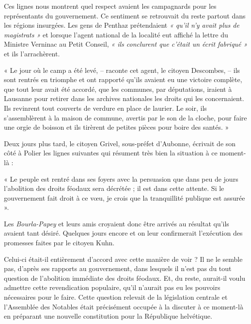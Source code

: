 \documentclass[french,twoside]{book} %
\newenvironment{quoteblock}%
  {\begin{quoting}}
  {\end{quoting}}
\newenvironment{quotebar}{%
    \def\FrameCommand{{\color{rubric!10!}\vrule width 0.5em} \hspace{0.9em}}%
    \def\OuterFrameSep{\itemsep} %
    \MakeFramed {\advance\hsize-\width \FrameRestore}
  }%
  {%
    \endMakeFramed
  }
\renewenvironment{quoteblock}%
  {%
    \savenotes
    \setstretch{0.9}
    \begin{quotebar}
  }
  {%
    \end{quotebar}
    \spewnotes
  }
\begin{document}
\noindent Ces lignes nous montrent quel respect avaient les campagnards pour les représentants du gouvernement. Ce sentiment se retrouvait du reste partout dans les régions insurgées. Les gens de Penthaz prétendaient \emph{« qu’il n’y avait plus de magistrats »} et lorsque l’agent national de la localité eut affiché la lettre du Ministre Verninac au Petit Conseil, \emph{« ils conclurent que c’était un écrit fabriqué »} et ils l’arrachèrent.\par

\begin{quoteblock}
 \noindent « Le jour où le camp a été levé, – raconte cet agent, le citoyen Descombes, – ils sont rentrés en triomphe et ont rapporté qu’ils avaient eu une victoire complète, que tout leur avait été accordé, que les communes, par députations, iraient à Lausanne pour retirer dans les archives nationales les droits qui les concernaient. Ils revinrent tout couverts de verdure en place de laurier. Le soir, ils s’assemblèrent à la maison de commune, avertis par le son de la cloche, pour faire une orgie de boisson et ils tirèrent de petites pièces pour boire des santés. »
 \end{quoteblock}

\noindent Deux jours plus tard, le citoyen Grivel, sous-préfet d’Aubonne, écrivait de son côté à Polier les lignes suivantes qui résument très bien la situation à ce moment-là :\par

\begin{quoteblock}
 \noindent « Le peuple est rentré dans ses foyers avec la persuasion que dans peu de jours l’abolition des droits féodaux sera décrétée ; il est dans cette attente. Si le gouvernement fait droit à ce vœu, je crois que la tranquillité publique est assurée ».
 \end{quoteblock}

\noindent Les \emph{Bourla-Papey} et leurs amis croyaient donc être arrivés au résultat qu’ils avaient tant désiré. Quelques jours encore et on leur confirmerait l’exécution des promesses faites par le citoyen Kuhn.\par
Celui-ci était-il entièrement d’accord avec cette manière de voir ? Il ne le semble pas, d’après ses rapports au gouvernement, dans lesquels il n’est pas du tout question de l’abolition immédiate des droits féodaux. Et, du reste, aurait-il voulu admettre cette revendication populaire, qu’il n’aurait pas eu les pouvoirs nécessaires pour le faire. Cette question relevait de la législation centrale et l’Assemblée des Notables était précisément occupée à la discuter à ce moment-là en préparant une nouvelle constitution pour la République helvétique.\par
\end{document}
